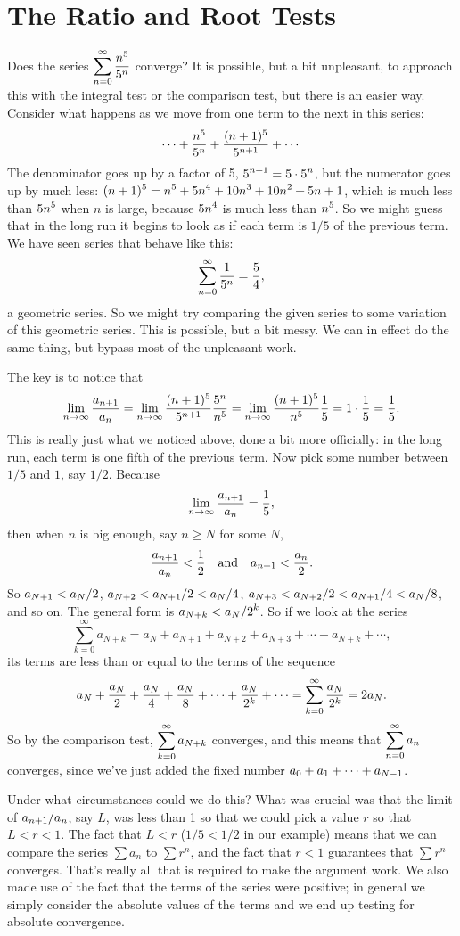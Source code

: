 \chapter{The Ratio and Root Tests}{}{}

\nobreak
Does the series $\displaystyle\sum_{n=0}^\infty {n^5\over 5^n}$ converge? It is
possible, but a bit unpleasant, to approach this with the integral
test or the comparison test, but there is an easier way. Consider what
happens as we move from one term to the next in this series:
$$\cdots+{n^5\over5^n}+{(n+1)^5\over 5^{n+1}}+\cdots$$
The denominator goes up by a factor of 5, $\displaystyle 5^{n+1}=5\cdot5^n$, but the
numerator goes up by much less: $\displaystyle (n+1)^5=n^5+5n^4+10n^3+10n^2+5n+1$,
which is much less than $\displaystyle 5n^5$ when $n$ is large, because $\displaystyle 5n^4$ is
much less than $\displaystyle n^5$. So we might guess that in the long run it begins
to look as if each term is $1/5$ of the previous term. We have seen
series that behave like this:
$$\sum_{n=0}^\infty {1\over 5^n} = {5\over4},$$
a geometric series. So we might try comparing the given series to some
variation of this geometric series. This is possible, but a bit
messy. We can in effect do the same thing, but bypass most of the
unpleasant work.

The key is to notice that
$$
  \lim_{n\to\infty} {a_{n+1}\over a_n}=
  \lim_{n\to\infty} {(n+1)^5\over 5^{n+1}}{5^n\over n^5}=
  \lim_{n\to\infty} {(n+1)^5\over n^5}{1\over 5}=1\cdot {1\over5}
    ={1\over 5}.
$$ 
This is really just what we noticed above, done a bit more officially:
in the long run, each term is one fifth of the previous term. Now pick
some number between $1/5$ and $1$, say $1/2$. Because
$$\lim_{n\to\infty} {a_{n+1}\over a_n}={1\over5},$$
then when $n$ is big enough, say $n\ge N$ for some $N$, 
$$
  {a_{n+1}\over a_n}<{1\over2} \hbox{\quad and\quad} a_{n+1}<{a_n\over2}.
$$
So $\displaystyle a_{N+1}< a_N/2$, $\displaystyle a_{N+2}<a_{N+1}/2<a_N/4$,
$\displaystyle a_{N+3}<a_{N+2}/2< a_{N+1}/4<a_N/8$, and so on. The general form is
$\displaystyle a_{N+k}< a_N/2^k$. So if we look at the series
$$
  \sum_{k=0}^\infty a_{N+k}=
  a_N+a_{N+1}+a_{N+2}+a_{N+3}+\cdots+a_{N+k}+\cdots,
$$
its terms are less than or equal to the terms of the sequence
$$
  a_N+{a_N\over2}+{a_N\over4}+{a_N\over8}+\cdots+{a_N\over2^k}+\cdots=
  \sum_{k=0}^\infty {a_N\over 2^k} = 2a_N.
$$
So by the comparison test, $\displaystyle\sum_{k=0}^\infty a_{N+k}$ converges,
and this means that $\displaystyle\sum_{n=0}^\infty a_{n}$ converges, since
we've just added the fixed number $\displaystyle a_0+a_1+\cdots+a_{N-1}$.

Under what circumstances could we do this? What was crucial was that
the limit of $\displaystyle a_{n+1}/a_n$, say $L$, was less than 1 so that we could pick a
value $r$ so that $L<r<1$. The fact that $L<r$ ($1/5<1/2$ in our
example) means that we can compare the series $\sum a_n$ to $\sum
r^n$, and the fact that $r<1$ guarantees that $\sum r^n$
converges. That's really all that is required to make the argument
work. We also made use of the fact that the terms of the series were
positive; in general we simply consider the absolute values of the
terms and we end up testing for absolute convergence.

